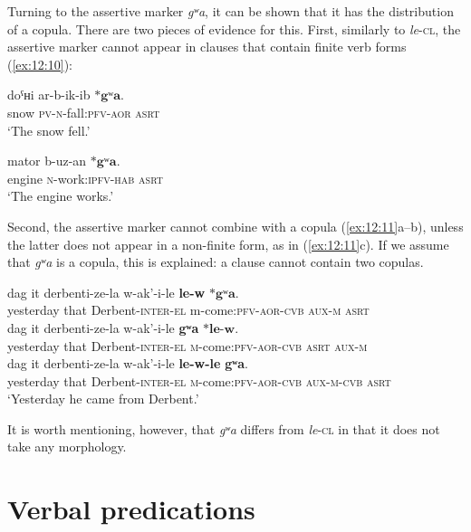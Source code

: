 ﻿\documentclass[output=paper]{langsci/langscibook}
\begin{document}
Turning to the assertive marker \emph{gʷa}, it can be shown that it has
the distribution of a copula. There are two pieces of evidence for this.
First, similarly to \emph{le}-\textsc{cl}, the assertive marker cannot appear in
clauses that contain finite verb forms (\ref{ex:12:10}):

\ea \label{ex:12:10} %
\ea %
\gll doˤʜi ar-b-ik-ib \(*\textbf{gʷa}\).\\
snow \textsc{pv}-\textsc{n}-fall:\textsc{pfv}-\textsc{aor} \textsc{asrt}\\
\glt `The snow fell.'

\ex %
\gll mator b-uz-an \(*\textbf{gʷa}\).\\
engine \textsc{n}-work:\textsc{ipfv}-\textsc{hab} \textsc{asrt}\\
\glt `The engine works.'
\z
\z

Second, the assertive marker cannot combine with a copula (\ref{ex:12:11}a–b),
unless the latter does not appear in a non-finite form, as in (\ref{ex:12:11}c). If
we assume that \emph{gʷa} is a copula, this is explained: a clause
cannot contain two copulas.

\ea \label{ex:12:11} %
\ea %
\gll dag it derbenti-ze-la w-ak'-i-le \textbf{le-w} \(*\textbf{gʷa}\).\\
yesterday that Derbent-\textsc{inter}-\textsc{el} m-come:\textsc{pfv}-\textsc{aor}-\textsc{cvb} \textsc{aux}-\textsc{m} \textsc{asrt}\\

\ex %
\gll dag it derbenti-ze-la w-ak'-i-le \textbf{gʷa} \(*\textbf{le-w}\).\\
yesterday that Derbent-\textsc{inter}-\textsc{el} \textsc{m}-come:\textsc{pfv}-\textsc{aor}-\textsc{cvb} \textsc{asrt} \textsc{aux}-\textsc{m}\\

\ex %
\gll dag it derbenti-ze-la w-ak'-i-le \textbf{le-w-le} \textbf{gʷa}.\\
yesterday that Derbent-\textsc{inter}-\textsc{el} \textsc{m}-come:\textsc{pfv}-\textsc{aor}-\textsc{cvb} \textsc{aux}-\textsc{m}-\textsc{cvb} \textsc{asrt}\\
\glt `Yesterday he came from Derbent.'
\z
\z

It is worth mentioning, however, that \emph{gʷa} differs from
\emph{le}-\textsc{cl} in that it does not take any morphology.

\section{Verbal predications}\label{verbal-predications}
\end{document}
